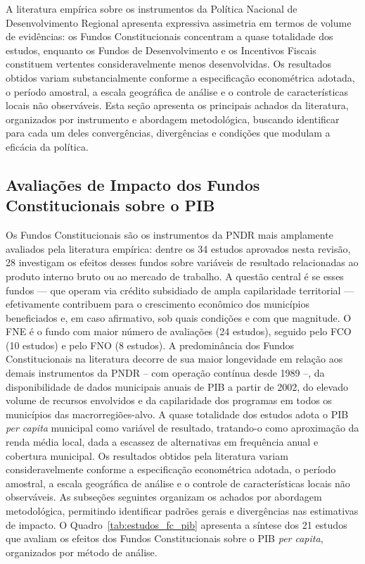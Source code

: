 
A literatura empírica sobre os instrumentos da Política Nacional de Desenvolvimento Regional apresenta expressiva assimetria em termos de volume de evidências: os Fundos Constitucionais concentram a quase totalidade dos estudos, enquanto os Fundos de Desenvolvimento e os Incentivos Fiscais constituem vertentes consideravelmente menos desenvolvidas. Os resultados obtidos variam substancialmente conforme a especificação econométrica adotada, o período amostral, a escala geográfica de análise e o controle de características locais não observáveis. Esta seção apresenta os principais achados da literatura, organizados por instrumento e abordagem metodológica, buscando identificar para cada um deles convergências, divergências e condições que modulam a eficácia da política.

\subsection{Avaliações de Impacto dos Fundos Constitucionais sobre o PIB}
\label{subsec:fc-pib}

Os Fundos Constitucionais são os instrumentos da PNDR mais amplamente avaliados pela literatura empírica: dentre os 34 estudos aprovados nesta revisão, 28 investigam os efeitos desses fundos sobre variáveis de resultado relacionadas ao produto interno bruto ou ao mercado de trabalho. A questão central é se esses fundos --- que operam via crédito subsidiado de ampla capilaridade territorial --- efetivamente contribuem para o crescimento econômico dos municípios beneficiados e, em caso afirmativo, sob quais condições e com que magnitude. O FNE é o fundo com maior número de avaliações (24 estudos), seguido pelo FCO (10 estudos) e pelo FNO (8 estudos). A predominância dos Fundos Constitucionais na literatura decorre de sua maior longevidade em relação aos demais instrumentos da PNDR -- com operação contínua desde 1989 --, da disponibilidade de dados municipais anuais de PIB a partir de 2002, do elevado volume de recursos envolvidos e da capilaridade dos programas em todos os municípios das macrorregiões-alvo. A quase totalidade dos estudos adota o PIB \textit{per capita} municipal como variável de resultado, tratando-o como aproximação da renda média local, dada a escassez de alternativas em frequência anual e cobertura municipal. Os resultados obtidos pela literatura variam consideravelmente conforme a especificação econométrica adotada, o período amostral, a escala geográfica de análise e o controle de características locais não observáveis. As subseções seguintes organizam os achados por abordagem metodológica, permitindo identificar padrões gerais e divergências nas estimativas de impacto. O Quadro~\ref{tab:estudos_fc_pib} apresenta a síntese dos 21 estudos que avaliam os efeitos dos Fundos Constitucionais sobre o PIB \textit{per capita}, organizados por método de análise.

